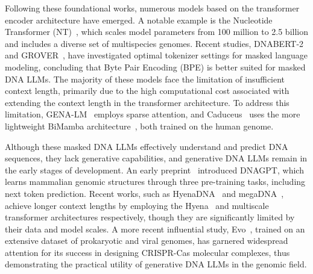Following these foundational works, numerous models based on the transformer encoder architecture have emerged. A notable example is the Nucleotide Transformer (NT)~\cite{nucleotide-transformer}, which scales model parameters from 100 million to 2.5 billion and includes a diverse set of multispecies genomes. Recent studies, DNABERT-2~\cite{DNABERT-2} and GROVER~\cite{GROVER}, have investigated optimal tokenizer settings for masked language modeling, concluding that Byte Pair Encoding (BPE) is better suited for masked DNA LLMs. The majority of these models face the limitation of insufficient context length, primarily due to the high computational cost associated with extending the context length in the transformer architecture. To address this limitation, GENA-LM~\cite{gena-lm} employs sparse attention, and Caduceus~\cite{Caduceus} uses the more lightweight BiMamba architecture~\cite{Mamba}, both trained on the human genome.

Although these masked DNA LLMs effectively understand and predict DNA sequences, they lack generative capabilities, and generative DNA LLMs remain in the early stages of development. An early preprint~\cite{dnagpt} introduced DNAGPT, which learns mammalian genomic structures through three pre-training tasks, including next token prediction. Recent works, such as HyenaDNA~\cite{HyenaDNA} and megaDNA~\cite{megaDNA}, achieve longer context lengths by employing the Hyena~\cite{Hyena} and multiscale transformer architectures respectively, though they are significantly limited by their data and model scales. A more recent influential study, Evo~\cite{Evo}, trained on an extensive dataset of prokaryotic and viral genomes, has garnered widespread attention for its success in designing CRISPR-Cas molecular complexes, thus demonstrating the practical utility of generative DNA LLMs in the genomic field.
